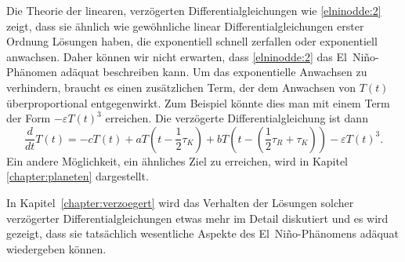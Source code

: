 Die Theorie der linearen, verzögerten Differentialgleichungen wie 
\eqref{elninodde:2} zeigt, dass sie ähnlich wie gewöhnliche linear
Differentialgleichungen erster Ordnung Lösungen haben, die exponentiell
schnell zerfallen oder exponentiell anwachsen.
Daher können wir nicht erwarten, dass \eqref{elninodde:2} das El~Niño-Phänomen
adäquat beschreiben kann.
Um das exponentielle Anwachsen zu verhindern, braucht es einen zusätzlichen
Term, der dem Anwachsen von $T(t)$ überproportional entgegenwirkt.
Zum Beispiel könnte dies man mit einem Term der Form $-\varepsilon T(t)^3$
erreichen.
Die verzögerte Differentialgleichung ist dann
\begin{equation}
\frac{d}{dt}T(t)
=
-cT(t) + aT(t-\frac12\tau_K) + bT(t-(\frac12\tau_R+\tau_K))
-\varepsilon T(t)^3.
\label{elninodde:3}
\end{equation}
Ein andere Möglichkeit, ein ähnliches Ziel zu erreichen, wird in Kapitel
\ref{chapter:planeten} dargestellt.

In Kapitel~\ref{chapter:verzoegert} wird das Verhalten der Lösungen
solcher verzögerter Differentialgleichungen etwas mehr im Detail
diskutiert und es wird gezeigt, dass sie tatsächlich wesentliche
Aspekte des El~Niño-Phänomens adäquat wiedergeben können.







